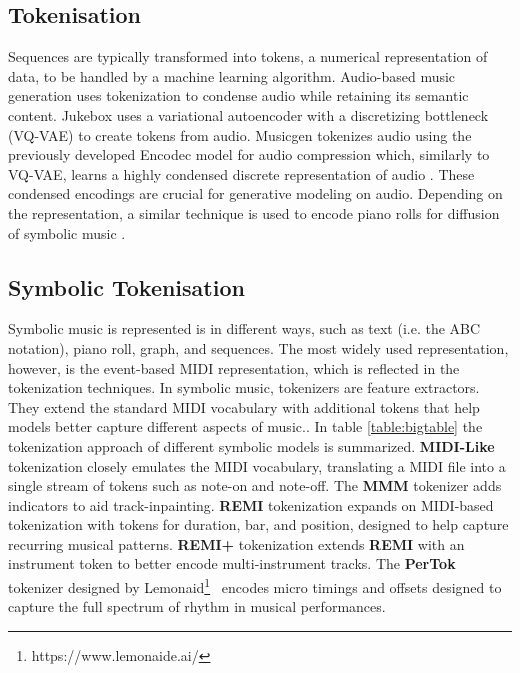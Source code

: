 \subsection{Tokenisation}\label{section:tokenization}
Sequences are typically transformed into tokens, a numerical representation of data, to be handled by a machine learning algorithm. Audio-based music generation uses tokenization to condense audio while retaining its semantic content. Jukebox \cite{Dhariwal_Jun_Payne_Kim_Radford_Sutskever_2020} uses a variational autoencoder\cite{Kingma_Welling_2014} with a discretizing bottleneck (VQ-VAE) to create tokens from audio. Musicgen \cite{copet2023simple} tokenizes audio using the previously developed Encodec model for audio compression which, similarly to VQ-VAE, learns a highly condensed discrete representation of audio \cite{Défossez_2023_encodec}. These condensed encodings are crucial for generative modeling on audio. Depending on the representation, a similar technique is used to encode piano rolls for diffusion of symbolic music \cite{Min_Jiang_Xia_Zhao_polyffusion_2023}\cite{Zhu_Liu_Jiang_Zheng_texture_2024}.

\subsection{Symbolic Tokenisation} \label{section:symbolic_tok}
Symbolic music is represented is in different ways, such as text (i.e. the ABC notation), piano roll, graph, and sequences. The most widely used representation, however, is the event-based MIDI representation, which is reflected in the tokenization techniques. In symbolic music, tokenizers are feature extractors. They extend the standard MIDI vocabulary with additional tokens that help models better capture different aspects of music.\cite{Fradet_Briot_Chhel_2021}. In table \ref{table:bigtable} the tokenization approach of different symbolic models is summarized. \textbf{MIDI-Like} tokenization closely emulates the MIDI vocabulary, translating a MIDI file into a single stream of tokens such as note-on and note-off. The \textbf{MMM} tokenizer adds indicators to aid track-inpainting. \textbf{REMI} \cite{Huang_Yang_remi_pop_transformer_2020} tokenization expands on MIDI-based tokenization with tokens for duration, bar, and position, designed to help capture recurring musical patterns. \textbf{REMI+} \cite{Rütte_figaro_2023} tokenization extends \textbf{REMI} with an instrument token to better encode multi-instrument tracks. The \textbf{PerTok} tokenizer designed by Lemonaid\footnote{https://www.lemonaide.ai/}  encodes micro timings and offsets designed to capture the full spectrum of rhythm in musical performances.\\

